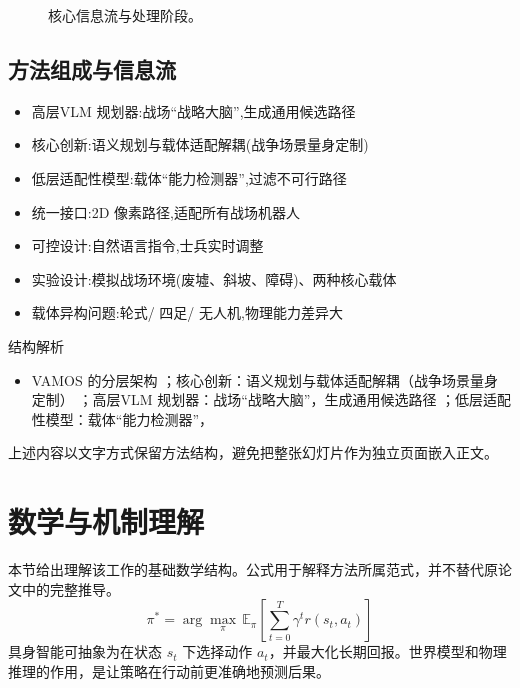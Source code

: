 \documentclass[UTF8,11pt,a4paper]{ctexart}
\begin{document}
\begin{figure}[H]
\centering
{}
\caption{核心信息流与处理阶段。}
\end{figure}

\subsection{方法组成与信息流}
\begin{itemize}
\item 高层VLM 规划器:战场“战略大脑”,生成通用候选路径
\item 核心创新:语义规划与载体适配解耦(战争场景量身定制)
\item 低层适配性模型:载体“能力检测器”,过滤不可行路径
\item 统一接口:2D 像素路径,适配所有战场机器人
\item 可控设计:自然语言指令,士兵实时调整
\item 实验设计:模拟战场环境(废墟、斜坡、障碍)、两种核心载体
\item 载体异构问题:轮式/ 四足/ 无人机,物理能力差异大
\end{itemize}

\begin{keybox}{结构解析}
\begin{itemize}
\item VAMOS 的分层架构 ；核心创新：语义规划与载体适配解耦（战争场景量身定制） ；高层VLM 规划器：战场“战略大脑”，生成通用候选路径 ；低层适配性模型：载体“能力检测器”，
\end{itemize}
\end{keybox}

上述内容以文字方式保留方法结构，避免把整张幻灯片作为独立页面嵌入正文。

\section{数学与机制理解}
本节给出理解该工作的基础数学结构。公式用于解释方法所属范式，并不替代原论文中的完整推导。
\begin{equation}
\pi^*=\arg\max_\pi\,\mathbb{E}_\pi\!\left[\sum_{t=0}^{T}\gamma^t r(s_t,a_t)\right]
\end{equation}
具身智能可抽象为在状态 $s_t$ 下选择动作 $a_t$，并最大化长期回报。世界模型和物理推理的作用，是让策略在行动前更准确地预测后果。
\end{document}
